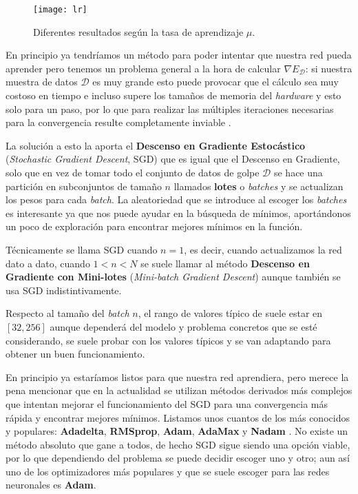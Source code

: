 \begin{figure}[htpb]
  \centering
  \texttt{[image: lr]}
  \caption{Diferentes resultados según la tasa de aprendizaje $\mu$.}
  \label{fig:lr}
\end{figure}

En principio ya tendríamos un método para poder intentar que nuestra red pueda aprender pero tenemos un problema general a la hora de calcular $\nabla E_\mathcal{D}$: si nuestra muestra de datos $\mathcal{D}$ es muy grande esto puede provocar que el cálculo sea muy costoso en tiempo e incluso supere los tamaños de memoria del \emph{hardware} y esto solo para un paso, por lo que para realizar las múltiples iteraciones necesarias para la convergencia resulte completamente inviable \cite{ruder2016overview}.

La solución a esto la aporta el \textbf{Descenso en Gradiente Estocástico} (\emph{Stochastic Gradient Descent}, SGD) \cite{robbins1951stochastic} que es igual que el Descenso en Gradiente, solo que en vez de tomar todo el conjunto de datos de golpe $\mathcal{D}$ se hace una partición en subconjuntos de tamaño $n$ llamados \textbf{lotes} o \emph{batches} y se actualizan los pesos para cada \emph{batch}. La aleatoriedad que se introduce al escoger los \emph{batches} es interesante ya que nos puede ayudar en la búsqueda de mínimos, aportándonos un poco de exploración para encontrar mejores mínimos en la función.

Técnicamente se llama SGD cuando $n=1$, es decir, cuando actualizamos la red dato a dato, cuando $1 < n < N$ se suele llamar al método \textbf{Descenso en Gradiente con Mini-lotes} (\emph{Mini-batch Gradient Descent}) aunque también se usa SGD indistintivamente.

Respecto al tamaño del \emph{batch} $n$, el rango de valores típico de suele estar en $[32, 256]$ aunque dependerá del modelo y problema concretos que se esté considerando, se suele probar con los valores típicos y se van adaptando para obtener un buen funcionamiento.

En principio ya estaríamos listos para que nuestra red aprendiera, pero merece la pena mencionar que en la actualidad se utilizan métodos derivados más complejos que intentan mejorar el funcionamiento del SGD para una convergencia más rápida y encontrar mejores mínimos. Listamos unos cuantos de los más conocidos y populares: \textbf{Adadelta}, \textbf{RMSprop}, \textbf{Adam}, \textbf{AdaMax} y \textbf{Nadam} \cite{ruder2016overview}. No existe un método absoluto que gane a todos, de hecho SGD sigue siendo una opción viable, por lo que dependiendo del problema se puede decidir escoger uno y otro; aun así uno de los optimizadores más populares y que se suele escoger para las redes neuronales es \textbf{Adam}.

